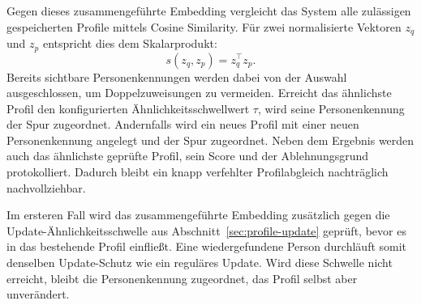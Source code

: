 Gegen dieses zusammengeführte Embedding vergleicht das System alle zulässigen gespeicherten Profile mittels Cosine Similarity. Für zwei normalisierte Vektoren $z_q$ und $z_p$ entspricht dies dem Skalarprodukt:
\begin{equation}
s(z_q,z_p)=z_q^\top z_p.
\label{eq:cosine}
\end{equation}
Bereits sichtbare Personenkennungen werden dabei von der Auswahl ausgeschlossen, um Doppelzuweisungen zu vermeiden. Erreicht das ähnlichste Profil den konfigurierten Ähnlichkeitsschwellwert $\tau$, wird seine Personenkennung der Spur zugeordnet. Andernfalls wird ein neues Profil mit einer neuen Personenkennung angelegt und der Spur zugeordnet. Neben dem Ergebnis werden auch das ähnlichste geprüfte Profil, sein Score und der Ablehnungsgrund protokolliert. Dadurch bleibt ein knapp verfehlter Profilabgleich nachträglich nachvollziehbar.

Im ersteren Fall wird das zusammengeführte Embedding zusätzlich gegen die Update-Ähnlichkeitsschwelle aus Abschnitt~\ref{sec:profile-update} geprüft, bevor es in das bestehende Profil einfließt. Eine wiedergefundene Person durchläuft somit denselben Update-Schutz wie ein reguläres Update. Wird diese Schwelle nicht erreicht, bleibt die Personenkennung zugeordnet, das Profil selbst aber unverändert.

